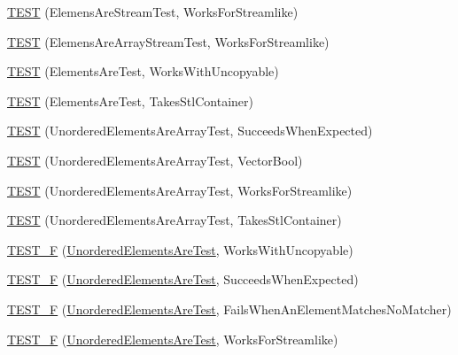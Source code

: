 \begin{DoxyCompactItemize}
\item 
\hyperlink{namespacetesting_1_1gmock__matchers__test_adb0f512a2369d69f056e42e1cc5f3fc2}{T\+E\+ST} (Elemens\+Are\+Stream\+Test, Works\+For\+Streamlike)
\item 
\hyperlink{namespacetesting_1_1gmock__matchers__test_a5cc317a80c3501cb7f53d07043b7270c}{T\+E\+ST} (Elemens\+Are\+Array\+Stream\+Test, Works\+For\+Streamlike)
\item 
\hyperlink{namespacetesting_1_1gmock__matchers__test_ab403dce87c2d198a4f709d7f781d03c6}{T\+E\+ST} (Elements\+Are\+Test, Works\+With\+Uncopyable)
\item 
\hyperlink{namespacetesting_1_1gmock__matchers__test_a290280b9e89a57833c9fc706d153b98a}{T\+E\+ST} (Elements\+Are\+Test, Takes\+Stl\+Container)
\item 
\hyperlink{namespacetesting_1_1gmock__matchers__test_adb7e47654f1536fc049243f765292825}{T\+E\+ST} (Unordered\+Elements\+Are\+Array\+Test, Succeeds\+When\+Expected)
\item 
\hyperlink{namespacetesting_1_1gmock__matchers__test_a3d7df4fa0dd3e8247f4c2d4b02d801f0}{T\+E\+ST} (Unordered\+Elements\+Are\+Array\+Test, Vector\+Bool)
\item 
\hyperlink{namespacetesting_1_1gmock__matchers__test_a1ff2a93a8f031a5b23dbc699a462043b}{T\+E\+ST} (Unordered\+Elements\+Are\+Array\+Test, Works\+For\+Streamlike)
\item 
\hyperlink{namespacetesting_1_1gmock__matchers__test_aa3a960ec78e2b1e860c305f4598f39ec}{T\+E\+ST} (Unordered\+Elements\+Are\+Array\+Test, Takes\+Stl\+Container)
\item 
\hyperlink{namespacetesting_1_1gmock__matchers__test_ab09132c3b991b8f104f3091370d2fe55}{T\+E\+S\+T\+\_\+F} (\hyperlink{classtesting_1_1gmock__matchers__test_1_1UnorderedElementsAreTest}{Unordered\+Elements\+Are\+Test}, Works\+With\+Uncopyable)
\item 
\hyperlink{namespacetesting_1_1gmock__matchers__test_a177c3db59da001df2441deb1ddb083af}{T\+E\+S\+T\+\_\+F} (\hyperlink{classtesting_1_1gmock__matchers__test_1_1UnorderedElementsAreTest}{Unordered\+Elements\+Are\+Test}, Succeeds\+When\+Expected)
\item 
\hyperlink{namespacetesting_1_1gmock__matchers__test_a62fd481b1160a667c785e6009ff87163}{T\+E\+S\+T\+\_\+F} (\hyperlink{classtesting_1_1gmock__matchers__test_1_1UnorderedElementsAreTest}{Unordered\+Elements\+Are\+Test}, Fails\+When\+An\+Element\+Matches\+No\+Matcher)
\item 
\hyperlink{namespacetesting_1_1gmock__matchers__test_a2affca2a152e4537c2f06518eaa2eac5}{T\+E\+S\+T\+\_\+F} (\hyperlink{classtesting_1_1gmock__matchers__test_1_1UnorderedElementsAreTest}{Unordered\+Elements\+Are\+Test}, Works\+For\+Streamlike)

\end{DoxyCompactItemize}
